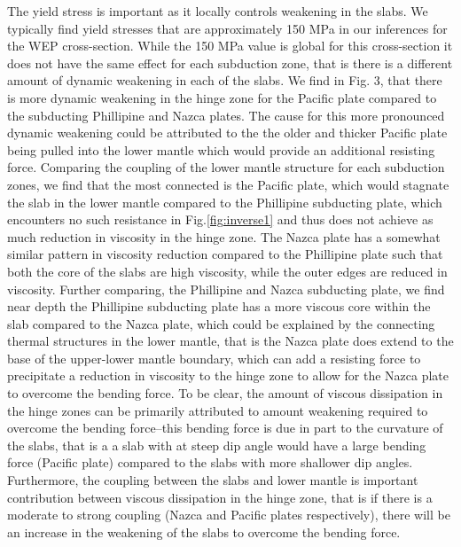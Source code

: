 \documentclass[12pt]{article}
\begin{document}
{  The yield stress is important as it locally controls weakening in the slabs. We typically find yield stresses that are approximately 150 MPa in our inferences for the WEP cross-section. While the 150 MPa value is global for this cross-section it does not have the same effect for each subduction zone, that is there is a different amount of dynamic weakening in each of the slabs. We find in Fig. 3, that there is more dynamic weakening in the hinge zone for the Pacific plate compared to the subducting Phillipine and Nazca plates. The cause for this more pronounced dynamic weakening could be attributed to the the older and thicker Pacific plate being pulled into the lower mantle which would provide an additional resisting force. Comparing the coupling of the lower mantle structure for each subduction zones, we find that the most connected is the Pacific plate, which would stagnate the slab in the lower mantle compared to the Phillipine subducting plate, which encounters no such resistance in Fig.\ref{fig:inverse1} and thus does not achieve as much reduction in viscosity in the hinge zone. The Nazca plate has a somewhat similar pattern in viscosity reduction compared to the Phillipine plate such that both the core of the slabs are high viscosity, while the outer edges are reduced in viscosity. Further comparing, the Phillipine and Nazca subducting plate, we find near depth the Phillipine subducting plate has a more viscous core within the slab compared to the Nazca plate, which could be explained by the connecting thermal structures in the lower mantle, that is the Nazca plate does extend to the base of the upper-lower mantle boundary, which can add a resisting force to precipitate a reduction in viscosity to the hinge zone to allow for the Nazca plate to overcome the bending force. To be clear, the amount of viscous dissipation in the hinge zones can be primarily attributed to amount weakening required to overcome the bending force--this bending force is due in part to the curvature of the slabs, that is a a slab with at steep dip angle would have a large bending force (Pacific plate) compared to the slabs with more shallower dip angles. Furthermore, the coupling between the slabs and lower mantle is important contribution between viscous dissipation in the hinge zone, that is if there is a moderate to strong coupling (Nazca and Pacific plates respectively), there will be an increase in the weakening of the slabs to overcome the bending force.  
}
\end{document}
